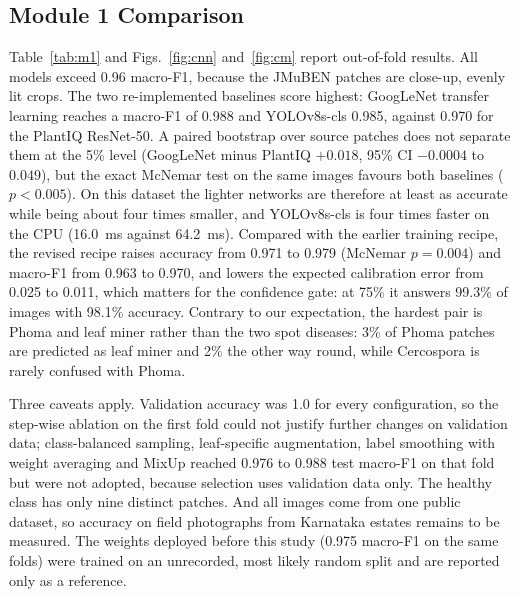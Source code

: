 \subsection{Module 1 Comparison}
Table~\ref{tab:m1} and Figs.~\ref{fig:cnn} and~\ref{fig:cm} report out-of-fold results. All models exceed 0.96 macro-F1,
because the JMuBEN patches are close-up, evenly lit crops. The two re-implemented baselines score highest: GoogLeNet
transfer learning reaches a macro-F1 of 0.988 and YOLOv8s-cls 0.985, against 0.970 for the PlantIQ ResNet-50. A paired
bootstrap over source patches does not separate them at the 5\% level (GoogLeNet minus PlantIQ $+0.018$, 95\% CI
$-0.0004$ to $0.049$), but the exact McNemar test on the same images favours both baselines ($p<0.005$). On this dataset
the lighter networks are therefore at least as accurate while being about four times smaller, and YOLOv8s-cls is four
times faster on the CPU (16.0~ms against 64.2~ms). Compared with the earlier training recipe, the revised recipe raises
accuracy from 0.971 to 0.979 (McNemar $p=0.004$) and macro-F1 from 0.963 to 0.970, and lowers the expected calibration
error from 0.025 to 0.011, which matters for the confidence gate: at 75\% it answers 99.3\% of images with 98.1\%
accuracy. Contrary to our expectation, the hardest pair is Phoma and leaf miner rather than the two spot diseases: 3\% of
Phoma patches are predicted as leaf miner and 2\% the other way round, while Cercospora is rarely confused with Phoma.

Three caveats apply. Validation accuracy was 1.0 for every configuration, so the step-wise ablation on the first fold
could not justify further changes on validation data; class-balanced sampling, leaf-specific augmentation, label
smoothing with weight averaging and MixUp reached 0.976 to 0.988 test macro-F1 on that fold but were not adopted, because
selection uses validation data only. The healthy class has only nine distinct patches. And all images come from one
public dataset, so accuracy on field photographs from Karnataka estates remains to be measured. The weights deployed
before this study (0.975 macro-F1 on the same folds) were trained on an unrecorded, most likely random split and are
reported only as a reference.

